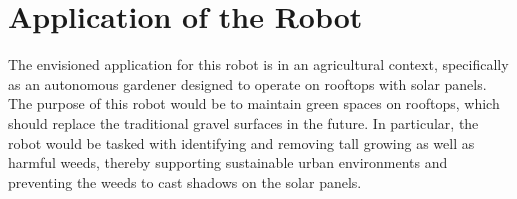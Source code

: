 \section{Application of the Robot}
The envisioned application for this robot is in an agricultural context, specifically as an autonomous gardener designed to operate on rooftops with solar panels. The purpose of this robot would be to maintain green spaces on rooftops, which should replace the traditional gravel surfaces in the future. In particular, the robot would be tasked with identifying and removing tall growing as well as harmful weeds, thereby supporting sustainable urban environments and preventing the weeds to cast shadows on the solar panels.  

